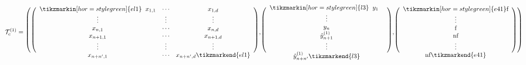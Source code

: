 \documentclass[english,xcolor={rgb,dvipsnames,table,usenames}, presentation]{beamer}
\renewcommand{\textcolor}[1]{}
\newcommand{\f}{\text{f}}
\newcommand{\nf}{\text{nf}}
\begin{document}
\begin{frame}
{\[ \hspace*{-0.8cm}\textcolor{white}{\mathcal{T}_{\text{c}}^{(1)} = {\Huge \Bigg(}}
\textcolor{white}{{\Huge \Bigg(}}
\begin{array}{ccc}
\tikzmarkin[hor=style green]{el1} \; \; x_{1,1} & \cdots & x_{1,d}  \\
 \vdots & \vdots & \vdots \\
 x_{n,1} & \cdots & x_{n,d} \\
 x_{n+1,1} & \cdots & x_{n+1,d}  \\
 \vdots & \vdots & \vdots \\
 x_{n+n',1} & \cdots & x_{n+n',d} \tikzmarkend{el1} \end{array} \textcolor{white}{{\Huge \Bigg)},}
\textcolor{white}{{\Huge \Bigg(}}
\begin{array}{c}
\tikzmarkin[hor=style green]{l3} \; \; y_1 \; \; \; \\
\vdots \\
 y_n \\ 
 \hat{y}_{n+1}^{(1)} \\
\vdots \\
\hat{y}_{n+n'}^{(1)} \tikzmarkend{l3}\end{array} \textcolor{white}{{\Huge \Bigg)},}
\textcolor{white}{{\Huge \Bigg(}}
\begin{array}{c}
\tikzmarkin[hor=style green]{e41} \text{f} \\
\vdots \\
\text{f} \\ 
\text{nf} \\
\vdots \\
\text{nf} \tikzmarkend{e41} \end{array} \textcolor{white}{{\Huge \Bigg) \Bigg)}}\]
 }
 

\end{frame}
\end{document}
